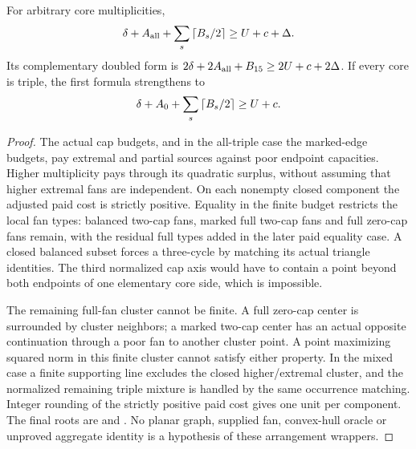 \begin{theorem}\label{upper:mixed-degree-free}
For arbitrary core multiplicities,
\begin{equation}
 \delta+A_{\rm all}+\sum_s\left\lceil B_s/2\right\rceil\ge U+c+\Delta.
 \label{upper:mixed-component}
\end{equation}
Its complementary doubled form is
$2\delta+2A_{\rm all}+B_{15}\ge2U+c+2\Delta$.
If every core is triple, the first formula strengthens to
\begin{equation}
 \delta+A_0+\sum_s\left\lceil B_s/2\right\rceil\ge U+c.
 \label{upper:marked-component}
\end{equation}
\end{theorem}
\begin{proof}
The actual cap budgets, and in the all-triple case the marked-edge budgets,
pay extremal and partial sources
against poor endpoint capacities. Higher multiplicity pays through its
quadratic surplus, without assuming that higher extremal fans are
independent. On each nonempty closed component the adjusted paid cost
is strictly positive. Equality in the finite budget restricts the local
fan types: balanced two-cap fans, marked full two-cap fans and full
zero-cap fans remain, with the residual full types added in the later
paid equality case. A closed balanced subset forces a three-cycle by
matching its actual triangle identities. The third normalized cap axis
would have to contain a point beyond both endpoints of one elementary
core side, which is impossible.

The remaining full-fan cluster cannot be finite. A full zero-cap center
is surrounded by cluster neighbors; a marked two-cap center has an
actual opposite continuation through a poor fan to another cluster point.
A point maximizing squared norm in this finite cluster cannot satisfy
either property. In the mixed case a finite supporting line excludes the
closed higher/extremal cluster, and the normalized remaining triple
mixture is handled by the same occurrence matching. Integer rounding
of the strictly positive paid cost gives one unit per component.
The final roots are
and .
No planar graph, supplied fan, convex-hull oracle or unproved aggregate
identity is a hypothesis of these arrangement wrappers.
\end{proof}

